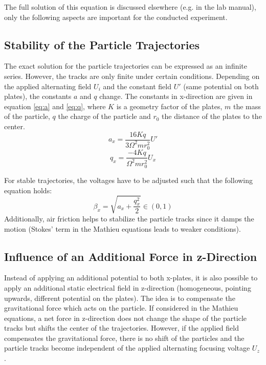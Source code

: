 \documentclass[
	paper=A4,
	parskip=full,
	chapterprefix=true,
	11pt,
	headings=normal,
	bibliography=totoc,
	listof=totoc,
	titlepage=on,
]{scrreprt}
\begin{document}
The full solution of this equation is discussed elsewhere (e.g. in the lab manual\cite{Lab_manual}), only the following aspects are important for the conducted experiment.

\subsection{Stability of the Particle Trajectories}
The exact solution for the particle trajectories can be expressed as an infinite series. However, the tracks are only finite under certain conditions. Depending on the applied alternating field $U_i$ and the constant field $U'$ (same potential on both plates), the constants $a$ and $q$ change. The constants in x-direction are given in equation \ref{eq:a} and \ref{eq:q}, where $K$ is a geometry factor of the plates, $m$ the mass of the particle, $q$ the charge of the particle and $r_0$ the distance of the plates to the center.
\begin{equation}
	\label{eq:a}
	a_x=\frac{16 K q}{3 \Omega^2 m r_0^2} U'
\end{equation}
\begin{equation}
	\label{eq:q}
	q_x= \frac{-4 K q}{ \Omega^2 m r_0^2} U_{x}
\end{equation}

For stable trajectories, the voltages have to be adjusted such that the following equation holds\cite{Lab_manual}:
\begin{equation}
	\label{eq:beta}
	\beta_x  = \sqrt{a_x+\frac{q_x^2}{2}}  \in (0,1)
\end{equation}
Additionally, air friction helps to stabilize the particle tracks since it damps the motion (Stokes' term in the Mathieu equations leads to weaker conditions). 

\subsection{Influence of an Additional Force in z-Direction}
Instead of applying an additional potential to both x-plates, it is also possible to apply an additional static electrical field in z-direction (homogeneous, pointing upwards, different potential on the plates). The idea is to compensate the gravitational force which acts on the particle. If considered in the Mathieu equations, a net force in z-direction does not change the shape of the particle tracks but shifts the center of the trajectories. However, if the applied field compensates the gravitational force, there is no shift of the particles and the particle tracks become independent of the applied alternating focusing voltage $U_z$ \cite{Lab_manual}.
\end{document}
